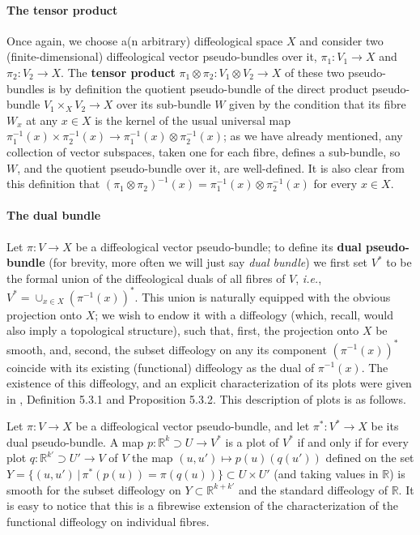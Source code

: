 \documentclass{article}
\newcommand\matR{{\mathbb{R}}}
\begin{document}
\paragraph{The tensor product} Once again, we choose a(n arbitrary) diffeological space $X$ and consider two (finite-dimensional) diffeological vector pseudo-bundles over it, $\pi_1:V_1\to X$ and
$\pi_2:V_2\to X$. The \textbf{tensor product} $\pi_1\otimes\pi_2:V_1\otimes V_2\to X$ of these two pseudo-bundles is by definition the quotient pseudo-bundle of the direct product pseudo-bundle 
$V_1\times_X V_2\to X$ over its sub-bundle $W$ given by the condition that its fibre $W_x$ at any $x\in X$ is the kernel of the usual universal map  
$\pi_1^{-1}(x)\times\pi_2^{-1}(x)\to\pi_1^{-1}(x)\otimes\pi_2^{-1}(x)$; as we have already mentioned, any collection of vector subspaces, taken one for each fibre, defines a sub-bundle, so $W$, and the
quotient pseudo-bundle over it, are well-defined. It is also clear from this definition that $(\pi_1\otimes\pi_2)^{-1}(x)=\pi_1^{-1}(x)\otimes\pi_2^{-1}(x)$ for every $x\in X$.

\paragraph{The dual bundle} Let $\pi:V\to X$ be a diffeological vector pseudo-bundle; to define its \textbf{dual pseudo-bundle} (for brevity, more often we will just say \emph{dual bundle}) we first set $V^*$ 
to be the formal union of the diffeological duals of all fibres of $V$, \emph{i.e.}, $V^*=\cup_{x\in X}(\pi^{-1}(x))^*$. This union is naturally equipped with the obvious projection onto $X$; we wish to endow it 
with a diffeology (which, recall, would also imply a topological structure), such that, first, the projection onto $X$ be smooth, and, second, the subset diffeology on any its component $(\pi^{-1}(x))^*$ coincide 
with its existing (functional) diffeology as the dual of $\pi^{-1}(x)$. The existence of this diffeology, and an explicit characterization of its plots were given in \cite{vincent}, Definition 5.3.1 and Proposition 5.3.2. 
This description of plots is as follows.

Let $\pi:V\to X$ be a diffeological vector pseudo-bundle, and let $\pi^*:V^*\to X$ be its dual pseudo-bundle. A map $p:\matR^k\supset U\to V^*$ is a plot of $V^*$ if and only if for every plot
$q:\matR^{k'}\supset U'\to V$ of $V$ the map $(u,u')\mapsto p(u)(q(u'))$ defined on the set $Y=\{(u,u')\,|\,\pi^*(p(u))=\pi(q(u))\}\subset U\times U'$ (and taking values in $\matR$) is smooth for the subset 
diffeology on $Y\subset\matR^{k+k'}$ and the standard diffeology of $\matR$. It is easy to notice that this is a fibrewise extension of the characterization of the functional diffeology on individual fibres.
\end{document}
